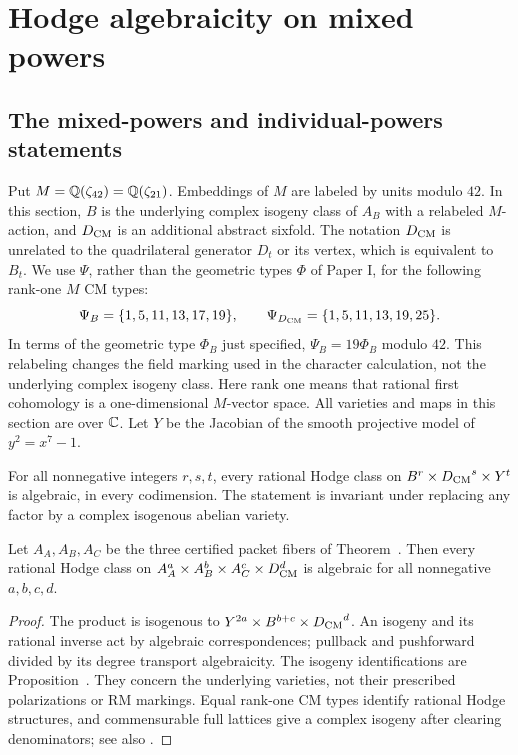 \section{Hodge algebraicity on mixed powers}\label{ext:sec:main}
\subsection{The mixed-powers and individual-powers statements}
Put $M=\mathbb Q(\zeta_{42})=\mathbb Q(\zeta_{21})$. Embeddings of $M$ are labeled
by units modulo $42$. In this section, $B$ is the underlying complex
isogeny class of $A_B$ with a relabeled $M$-action, and $D_{\mathrm{CM}}$
is an additional abstract sixfold. The notation $D_{\mathrm{CM}}$ is unrelated
to the quadrilateral generator $D_t$ or its vertex, which is equivalent
to $B_t$. We use $\Psi$, rather than the geometric types $\Phi$ of Paper I,
for the following rank-one $M$ CM types:
\[
 \Psi_B=\{1,5,11,13,17,19\},\qquad
 \Psi_{D_{\mathrm{CM}}}=\{1,5,11,13,19,25\}.
\]
In terms of the geometric type $\Phi_B$ just specified, $\Psi_B=19\Phi_B$
modulo $42$. This relabeling changes the field marking used in the
character calculation, not the underlying complex isogeny class.
Here rank one means that rational first cohomology is a one-dimensional
$M$-vector space. All varieties and maps in this section are over
$\mathbb C$. Let $Y$ be the Jacobian of the smooth projective model of
$y^2=x^7-1$.

\begin{theorem}\label{ext:thm:mixed}
For all nonnegative integers $r,s,t$, every rational Hodge class on
$B^r\times {\ensuremath{D_{\mathrm{CM}}}}^s\times Y^t$ is algebraic, in every codimension.
The statement is invariant under replacing any factor by a complex
isogenous abelian variety.
\end{theorem}

\begin{corollary}
Let $A_A,A_B,A_C$ be the three certified packet fibers of Theorem~.
Then every rational Hodge class on
$A_A^a\times A_B^b\times A_C^c\times D_{\mathrm{CM}}^d$ is algebraic for all nonnegative
$a,b,c,d$.
\end{corollary}
\begin{proof}
The product is isogenous to $Y^{2a}\times B^{b+c}\times {\ensuremath{D_{\mathrm{CM}}}}^d$.
An isogeny and its rational inverse act by algebraic correspondences;
pullback and pushforward divided by its degree transport algebraicity.
The isogeny identifications are Proposition~.
They concern the underlying varieties, not their prescribed polarizations
or RM markings. Equal rank-one CM types identify rational Hodge
structures, and commensurable full lattices give a complex isogeny after
clearing denominators; see also \cite[\S3.11, Prop.~3.12]{MilneCM2020}.
\end{proof}

